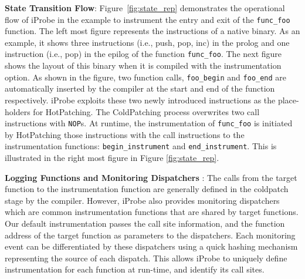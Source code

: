 \noindent \textbf{State Transition Flow}: \quad Figure~\ref{fig:state_rep} demonstrates the operational flow of iProbe in the example to instrument the entry and exit of the \texttt{func\_foo} function. 
The left most figure represents the instructions of a native binary. 
As an example, it shows three instructions (i.e., push, pop, inc) in the prolog and one instruction (i.e., pop) in the epilog of the function \texttt{func\_foo}. 
The next figure shows the layout of this binary when it is compiled with the instrumentation option. 
As shown in the figure, two function calls, \texttt{foo\_begin} and \texttt{foo\_end} are automatically inserted by the compiler at the start and end of the function respectively. 
iProbe exploits these two newly introduced instructions as the place-holders for HotPatching. 
The ColdPatching process overwrites two call instructions with \texttt{NOP}s. 
At runtime, the instrumentation of \texttt{func\_foo} is initiated by HotPatching those instructions with the call instructions to the instrumentation functions: \texttt{begin\_instrument} and \texttt{end\_instrument}. 
This is illustrated in the right most figure in Figure \ref{fig:state_rep}.

\noindent \textbf{Logging Functions and Monitoring Dispatchers} : \quad
%
The calls from the target function to the instrumentation function are generally defined in the coldpatch stage by the compiler. 
However, iProbe also provides monitoring dispatchers which are common instrumentation functions that are shared by target functions. 
Our default instrumentation passes the call site information, and the function address of the target function as parameters to the dispatchers. 
Each monitoring event can be differentiated by these dispatchers using a quick hashing mechanism representing the source of each dispatch.
This allows iProbe to uniquely define instrumentation for each function at run-time, and identify its call sites.

%
%


